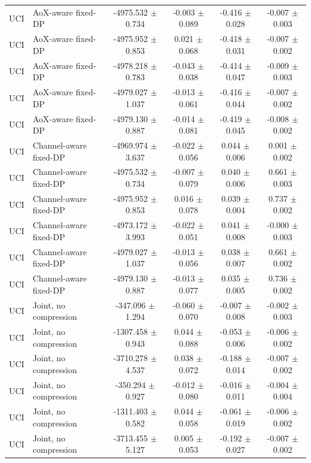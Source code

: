 \begin{table}[t]
\begin{tabular}{llcccc}
UCI & AoX-aware fixed-DP & -4975.532 $\pm$ 0.734 & -0.003 $\pm$ 0.089 & -0.416 $\pm$ 0.028 & -0.007 $\pm$ 0.003 \\
UCI & AoX-aware fixed-DP & -4975.952 $\pm$ 0.853 & 0.021 $\pm$ 0.068 & -0.418 $\pm$ 0.031 & -0.007 $\pm$ 0.002 \\
UCI & AoX-aware fixed-DP & -4978.218 $\pm$ 0.783 & -0.043 $\pm$ 0.038 & -0.414 $\pm$ 0.047 & -0.009 $\pm$ 0.003 \\
UCI & AoX-aware fixed-DP & -4979.027 $\pm$ 1.037 & -0.013 $\pm$ 0.061 & -0.416 $\pm$ 0.044 & -0.007 $\pm$ 0.002 \\
UCI & AoX-aware fixed-DP & -4979.130 $\pm$ 0.887 & -0.014 $\pm$ 0.081 & -0.419 $\pm$ 0.045 & -0.008 $\pm$ 0.002 \\
UCI & Channel-aware fixed-DP & -4969.974 $\pm$ 3.637 & -0.022 $\pm$ 0.056 & 0.044 $\pm$ 0.006 & 0.001 $\pm$ 0.002 \\
UCI & Channel-aware fixed-DP & -4975.532 $\pm$ 0.734 & -0.007 $\pm$ 0.079 & 0.040 $\pm$ 0.006 & 0.661 $\pm$ 0.003 \\
UCI & Channel-aware fixed-DP & -4975.952 $\pm$ 0.853 & 0.016 $\pm$ 0.078 & 0.039 $\pm$ 0.004 & 0.737 $\pm$ 0.002 \\
UCI & Channel-aware fixed-DP & -4973.172 $\pm$ 3.993 & -0.022 $\pm$ 0.051 & 0.041 $\pm$ 0.008 & -0.000 $\pm$ 0.003 \\
UCI & Channel-aware fixed-DP & -4979.027 $\pm$ 1.037 & -0.013 $\pm$ 0.056 & 0.038 $\pm$ 0.007 & 0.661 $\pm$ 0.002 \\
UCI & Channel-aware fixed-DP & -4979.130 $\pm$ 0.887 & -0.013 $\pm$ 0.077 & 0.035 $\pm$ 0.005 & 0.736 $\pm$ 0.002 \\
UCI & Joint, no compression & -347.096 $\pm$ 1.294 & -0.060 $\pm$ 0.070 & -0.007 $\pm$ 0.008 & -0.002 $\pm$ 0.003 \\
UCI & Joint, no compression & -1307.458 $\pm$ 0.943 & 0.044 $\pm$ 0.088 & -0.053 $\pm$ 0.006 & -0.006 $\pm$ 0.002 \\
UCI & Joint, no compression & -3710.278 $\pm$ 4.537 & 0.038 $\pm$ 0.072 & -0.188 $\pm$ 0.014 & -0.007 $\pm$ 0.002 \\
UCI & Joint, no compression & -350.294 $\pm$ 0.927 & -0.012 $\pm$ 0.080 & -0.016 $\pm$ 0.011 & -0.004 $\pm$ 0.004 \\
UCI & Joint, no compression & -1311.403 $\pm$ 0.582 & 0.044 $\pm$ 0.058 & -0.061 $\pm$ 0.019 & -0.006 $\pm$ 0.002 \\
UCI & Joint, no compression & -3713.455 $\pm$ 5.127 & 0.005 $\pm$ 0.053 & -0.192 $\pm$ 0.027 & -0.007 $\pm$ 0.002 \\

\end{tabular}
\end{table}
